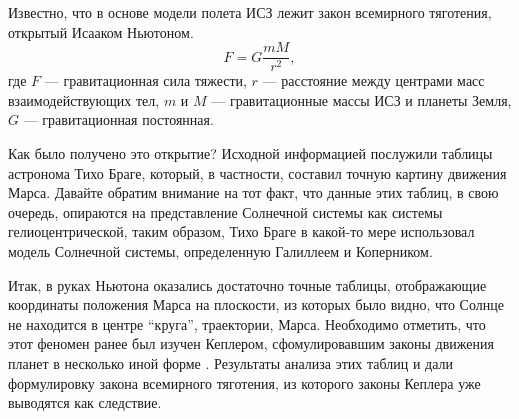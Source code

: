 \documentclass[12pt, openany, twoside]{book} %
\begin{document}
Известно, что в основе модели полета ИСЗ лежит закон всемирного тяготения, открытый Исааком Ньютоном. 
\begin{equation}
F = G\frac{mM}{r^2}, \label{newton}
\end{equation}
где $F$ --- гравитационная сила тяжести, $r$ --- расстояние между центрами масс взаимодействующих тел,
$m$ и $M$ --- гравитационные массы ИСЗ и планеты Земля, $G$ --- гравитационная постоянная.

Как было получено это открытие? Исходной информацией послужили таблицы астронома Тихо Браге, который, в частности, составил точную картину движения Марса. Давайте обратим внимание на тот факт, что данные этих таблиц, в свою очередь, опираются на представление Солнечной системы как системы гелиоцентрической, таким образом, Тихо Браге в какой-то мере использовал модель Солнечной системы, определенную Галиллеем и Коперником. 

Итак, в руках Ньютона оказались достаточно точные таблицы, отображающие координаты положения Марса на плоскости, из которых было видно, что Солнце не находится в центре ``круга'', траектории, Марса. Необходимо отметить, что этот феномен ранее был изучен Кеплером, сфомулировавшим законы движения планет в несколько иной форме \cite{avanta}. Результаты анализа этих таблиц и дали формулировку закона всемирного тяготения, из которого законы Кеплера уже выводятся как следствие. 
\end{document}
